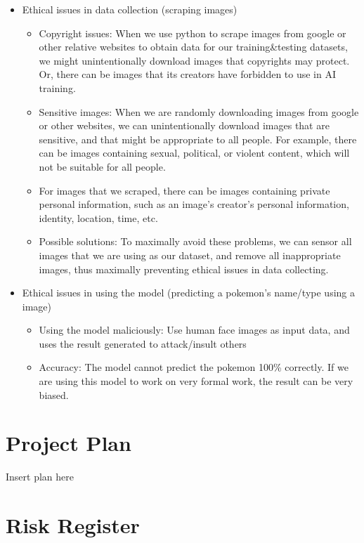 \documentclass{article} %
\begin{document}
\begin{itemize}
  \item Ethical issues in data collection (scraping images)
  \begin{itemize}
    \item Copyright issues: When we use python to scrape images from google or other relative websites to obtain data for our training\&testing datasets, we might unintentionally download images that copyrights may protect. Or, there can be images that its creators have forbidden to use in AI training.
    \item Sensitive images: When we are randomly downloading images from google or other websites, we can unintentionally download images that are sensitive, and that might be appropriate to all people. For example, there can be images containing sexual, political, or violent content, which will not be suitable for all people.
    \item For images that we scraped, there can be images containing private personal information, such as an image’s creator’s personal information, identity, location, time, etc. 
    \item Possible solutions: To maximally avoid these problems, we can sensor all images that we are using as our dataset, and remove all inappropriate images, thus maximally preventing ethical issues in data collecting.
  \end{itemize}
  \item Ethical issues in using the model (predicting a pokemon’s name/type using a image)
  \begin{itemize}
    \item Using the model maliciously: Use human face images as input data, and uses the result generated to attack/insult others
    \item Accuracy: The model cannot predict the pokemon 100\% correctly. If we are using this model to work on very formal work, the result can be very biased.
  \end{itemize}
\end{itemize}

\section {Project Plan}

Insert plan here

\section {Risk Register}
\end{document}
